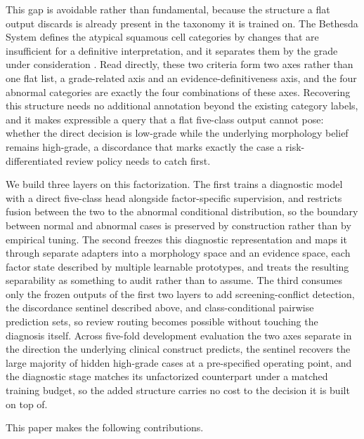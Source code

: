 \documentclass[conference]{IEEEtran}
\begin{document}
This gap is avoidable rather than fundamental, because the structure a
flat output discards is already present in the taxonomy it is trained
on. The Bethesda System defines the atypical squamous cell categories
by changes that are insufficient for a definitive interpretation, and
it separates them by the grade under consideration \cite{nayar2015bethesda}. Read directly,
these two criteria form two axes rather than one flat list, a
grade-related axis and an evidence-definitiveness axis, and the four
abnormal categories are exactly the four combinations of these axes.
Recovering this structure needs no additional annotation beyond the
existing category labels, and it makes expressible a query that a flat
five-class output cannot pose: whether the direct decision is low-grade
while the underlying morphology belief remains high-grade, a
discordance that marks exactly the case a risk-differentiated review
policy needs to catch first.

We build three layers on this factorization. The first trains a
diagnostic model with a direct five-class head alongside
factor-specific supervision, and restricts fusion between the two to
the abnormal conditional distribution, so the boundary between normal
and abnormal cases is preserved by construction rather than by
empirical tuning. The second freezes this diagnostic representation
and maps it through separate adapters into a morphology space and an
evidence space, each factor state described by multiple learnable
prototypes, and treats the resulting separability as something to
audit rather than to assume. The third consumes only the frozen
outputs of the first two layers to add screening-conflict detection,
the discordance sentinel described above, and class-conditional
pairwise prediction sets, so review routing becomes possible without
touching the diagnosis itself. Across five-fold development evaluation
the two axes separate in the direction the underlying clinical
construct predicts, the sentinel recovers the large majority of hidden
high-grade cases at a pre-specified operating point, and the
diagnostic stage matches its unfactorized counterpart under a matched
training budget, so the added structure carries no cost to the
decision it is built on top of.

This paper makes the following contributions.
\end{document}
